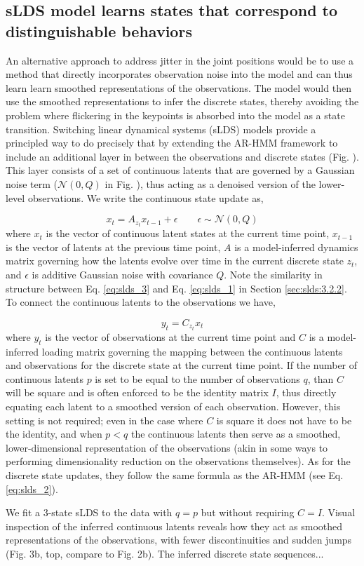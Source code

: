 \subsection{sLDS model learns states that correspond to distinguishable behaviors}
\label{sec:slds:3.2.3}
An alternative approach to address jitter in the joint positions would be to use a method that directly incorporates observation noise into the model and can thus learn learn smoothed representations of the observations. The model would then use the smoothed representations to infer the discrete states, thereby avoiding the problem where flickering in the keypoints is absorbed into the model as a state transition. Switching linear dynamical systems (sLDS) models provide a principled way to do precisely that by extending the AR-HMM framework to include an additional layer in between the observations and discrete states (Fig. ). This layer consists of a set of continuous latents that are governed by a Gaussian noise term ($\mathcal{N}(0,Q)$ in Fig. ), thus acting as a denoised version of the lower-level observations. We write the continuous state update as, 

\begin{equation} \label{eq:slds_3}
x_t = A_{z_t} x_{t-1} + \epsilon \qquad \epsilon \sim \mathcal{N}(0,Q)
\end{equation}
where $x_t$ is the vector of continuous latent states at the current time point, $x_{t-1}$ is the vector of latents at the previous time point, $A$ is a model-inferred dynamics matrix governing how the latents evolve over time in the current discrete state $z_t$, and $\epsilon$ is additive Gaussian noise with covariance $Q$. Note the similarity in structure between Eq. \ref{eq:slds_3} and Eq. \ref{eq:slds_1} in Section \ref{sec:slds:3.2.2}. To connect the continuous latents to the observations we have, 

\begin{equation} \label{eq:slds_4}
y_t = C_{z_t}x_{t} 
\end{equation}
where $y_t$ is the vector of observations at the current time point and $C$ is a model-inferred loading matrix governing the mapping between the continuous latents and observations for the discrete state at the current time point. If the number of continuous latents $p$ is set to be equal to the number of observations $q$, than $C$ will be square and is often enforced to be the identity matrix $I$, thus directly equating each latent to a smoothed version of each observation. However, this setting is not required; even in the case where $C$ is square it does not have to be the identity, and when $p<q$ the continuous latents then serve as a smoothed, lower-dimensional representation of the observations (akin in some ways to performing dimensionality reduction on the observations themselves). As for the discrete state updates, they follow the same formula as the AR-HMM (see Eq. \ref{eq:slds_2}). 

We fit a 3-state sLDS to the data with $q=p$ but without requiring $C=I$. Visual inspection of the inferred continuous latents reveals how they act as smoothed representations of the observations, with fewer discontinuities and sudden jumps (Fig. 3b, top, compare to Fig. 2b). The inferred discrete state sequences... 
